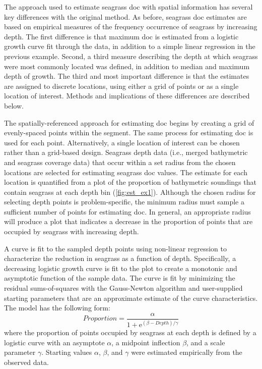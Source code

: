 \documentclass[letterpaper,12pt,oneside]{article}\usepackage[]{graphicx}\usepackage[]{color}
\begin{document}
The approach used to estimate seagrass \ac{doc} with spatial information has several key differences with the original method.  As before, seagrass \ac{doc} estimates are based on empirical measures of the frequency occurrence of seagrass by increasing depth.  The first difference is that maximum \ac{doc} is estimated from a logistic growth curve fit through the data, in addition to a simple linear regression in the previous example.  Second, a third measure describing the depth at which seagrass were most commonly located was defined, in addition to median and maximum depth of growth.  The third and most important difference is that the estimates are assigned to discrete locations, using either a grid of points or as a single location of interest. Methods and implications of these differences are described below.                                   

The spatially-referenced approach for estimating \ac{doc} begins by creating a grid of evenly-spaced points within the segment.  The same process for estimating \ac{doc} is used for each point.  Alternatively, a single location of interest can be chosen rather than a grid-based design.  Seagrass depth data (i.e., merged bathymetric and seagrass coverage data) that occur within a set radius from the chosen locations are selected for estimating seagrass \ac{doc} values. The estimate for each location is quantified from a plot of the proportion of bathymetric soundings that contain seagrass at each depth bin (\cref{fig:est_ex1}).  Although the chosen radius for selecting depth points is problem-specific, the minimum radius must sample a sufficient number of points for estimating \ac{doc}.  In general, an appropriate radius will produce a plot that indicates a decrease in the proportion of points that are occupied by seagrass with increasing depth.  

A curve is fit to the sampled depth points using non-linear regression to characterize the reduction in seagrass as a function of depth.  Specifically, a decreasing logistic growth curve is fit to the plot to create a monotonic and asymptotic function of the sample data.   The curve is fit by minimizing the residual sums-of-squares with the Gauss-Newton algorithm \citep{Bates92} and user-supplied starting parameters that are an approximate estimate of the curve characteristics.  The model has the following form:
\begin{equation}
 Proportion = \frac{\alpha}{1 + \mathrm{e}^{{\left(\beta - Depth\right)/\gamma}}}
\end{equation}
where the proportion of points occupied by seagrass at each depth is defined by a logistic curve with an asymptote $\alpha$, a midpoint inflection $\beta$, and a scale parameter $\gamma$.  Starting values $\alpha$, $\beta$, and $\gamma$ were estimated empirically from the observed data.  
\end{document}
